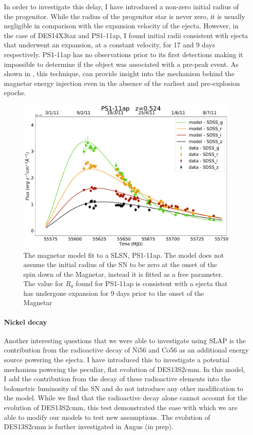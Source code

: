 In order to investigate this delay, I have introduced a non-zero initial radius of the progenitor. While the radius of the progenitor star is never zero, it is usually negligible in comparison with the expansion velocity of the ejecta. However, in the case of DES14X3taz and PS1-11ap, I found initial radii consistent with ejecta that underwent an expansion, at a constant velocity, for 17 and 9 days respectively. PS1-11ap has no observations prior to its first detections making it impossible to determine if the object was associated with a pre-peak event. As shown in , this technique, can provide insight into the mechanism behind the magnetar energy injection even in the absence of the earliest and pre-explosion epochs.

\begin{figure}
  \centering
  \includegraphics[width=\textwidth]{Figures/Chapter4/PS1-11ap}
  \caption{The magnetar model fit to a SLSN, PS1-11ap. The model does not assume the initial radius of the SN to be zero at the onset of the spin down of the Magnetar, instead it is fitted as a free parameter. The value for $R_0$ found for PS1-11ap is consistent with a ejecta that has undergone expansion for 9 days prior to the onset of the Magnetar}
  \label{fig:PS1-11apR0}
\end{figure}

\paragraph{Nickel decay}
Another interesting questions that we were able to investigate using \textsc{SLAP} is the contribution from the radioactive decay of Ni56 and Co56 as an additional energy source powering the ejecta. I have introduced this to investigate a potential mechanism powering the peculiar, flat evolution of DES13S2cmm. In this model, I add the contribution from the decay of these radioactive elements into the bolometric luminosity of the SN and do not introduce any other modification to the model. While we find that the radioactive decay alone cannot account for the evolution of DES13S2cmm, this test demonstrated the ease with which we are able to modify our models to test new assumptions. The evolution of DES13S2cmm is further investigated in Angus (in prep).

